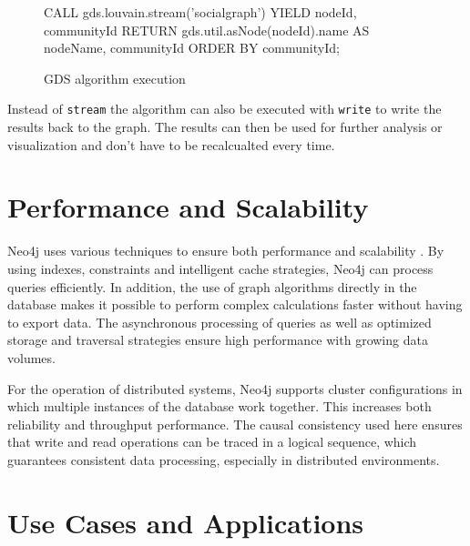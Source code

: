 \documentclass[english,smartquotes,apa]{hgbreport}
\begin{document}
\begin{figure}[h]
	\begin{GenericCode}[numbers=none]
		CALL gds.louvain.stream('socialgraph')
		YIELD nodeId, communityId
		RETURN gds.util.asNode(nodeId).name AS nodeName, communityId
		ORDER BY communityId;
	\end{GenericCode}
	\caption{GDS algorithm execution}
	\label{lst:gds-algorithm}
\end{figure}

Instead of \lstinline{stream} the algorithm can also be executed with \lstinline{write} to write the results back to the graph. The results can then be used for further analysis or visualization and don't have to be recalcualted every time.


\section*{Performance and Scalability}

Neo4j uses various techniques to ensure both performance and scalability \parencite{neo4j-operations-manual}.  By using indexes, constraints and intelligent cache strategies, Neo4j can process queries efficiently. In addition, the use of graph algorithms directly in the database makes it possible to perform complex calculations faster without having to export data. The asynchronous processing of queries as well as optimized storage and traversal strategies ensure high performance with growing data volumes.

For the operation of distributed systems, Neo4j supports cluster configurations in which multiple instances of the database work together. This increases both reliability and throughput performance. The causal consistency used here ensures that write and read operations can be traced in a logical sequence, which guarantees consistent data processing, especially in distributed environments.


\section*{Use Cases and Applications}
\end{document}
